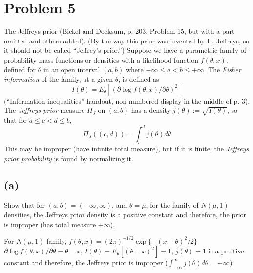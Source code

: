 \section{Problem 5}
\ProbS
The Jeffreys prior (Bickel and Docksum, p. 203, Problem 15, but with a part omitted and others added). (By the way this prior was invented by H. Jeffreys, so it should not be called ``Jeffrey's prior.'')
Suppose we have a parametric family of probability mass functions or densities with a likelihood function $f(\theta, x)$, defined for $\theta$ in an open interval $(a,b)$ where $-\infty \leq a < b \leq +\infty$.
The \emph{Fisher information} of the family, at a given $\theta$, is defined as
$$
I(\theta) = E_{\theta}[(\partial \log f(\theta, x) / \partial \theta)^2]
$$
(``Information inequalities'' handout, non-numbered display in the middle of p. 3). The \emph{Jeffreys prior} measure $\Pi_{J}$ on $(a,b)$ has a density
$
j(\theta) := \sqrt{I(\theta)}
$, so that for
$a \leq c < d \leq b$,
$$
\Pi_{J}((c,d)) = \int_{c}^{d} j(\theta) d\theta
$$
This may be improper (have infinite total measure), but if it is finite, the \emph{Jeffreys prior probability} is found by normalizing it.
\ProbE

\subsection*{(a)}
\ProbS
Show that for $(a,b) = (-\infty, \infty)$, and $\theta = \mu$, for the family of $N(\mu, 1)$ densities, the Jeffreys prior density is a positive constant and therefore, the prior is improper (has total measure $+\infty$).
\ProbE

For $N(\mu, 1)$ family,
$
f(\theta, x) =
(2\pi)^{-1/2}\exp\{{-(x-\theta)^2}/{2}\}
$
\\
$
\partial \log f(\theta, x) / \partial\theta = \theta-x
$,
$
I(\theta) = E_\theta[(\theta-x)^2] = 1
$,
$
j(\theta) = 1
$
is a positive constant and therefore, the Jeffreys prior is improper
($
\int_{-\infty}^{\infty} j(\theta) d\theta = +\infty
$).

